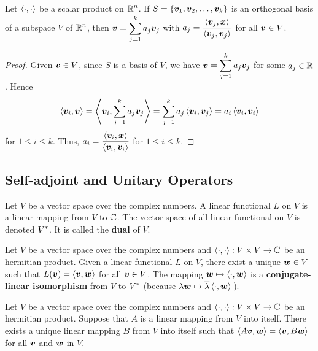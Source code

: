 \begin{prop}
Let $\left\langle{\cdot} , {\cdot}\right\rangle$ be a scalar product on $\displaystyle \mathbb{R}^n$.  If
$S = \{\bm{v}_1, \bm{v}_2, \ldots , \bm{v}_k\}$ is an orthogonal
basis of a subspace $V$ of $\displaystyle \mathbb{R}^n$, then
$\displaystyle \bm{v} = \sum_{j=1}^k a_j \bm{v}_j$ with
$\displaystyle a_j = \frac{\left\langle{\bm{v}_j} , {\bm{x}}\right\rangle}
{\left\langle{\bm{v}_j} , {\bm{v}_j}\right\rangle}$ for all $\bm{v} \in V$.
\label{C14L2}
\end{prop}

\begin{proof}
Given $\bm{v} \in V$, since $S$ is a basis of $V$, we have
$\displaystyle \bm{v} = \sum_{j=1}^k a_j \bm{v}_j$ for some
$a_j \in \mathbb{R}$.  Hence
\[
\left\langle{\bm{v}_i} , {\bm{v}}\right\rangle =
\left\langle{\bm{v}_i} , {\sum_{j=1}^k a_j \bm{v}_j}\right\rangle
= \sum_{j=1}^k a_j \left\langle{\bm{v}_i} , {\bm{v}_j}\right\rangle
= a_i \left\langle{\bm{v}_i} , {\bm{v}_i}\right\rangle
\]
for $1 \leq i \leq k$.  Thus,
$\displaystyle a_i = \frac{\left\langle{\bm{v}_i} , {\bm{x}}\right\rangle}
{\left\langle{\bm{v}_i} , {\bm{v}_i}\right\rangle}$ for $1 \leq i \leq k$.
\end{proof}

\subsection{Self-adjoint and Unitary Operators}

Let $V$ be a vector space over the complex numbers.  A linear
functional $L$ on $V$ is a linear mapping
from $V$ to $\mathbb{C}$.  The vector space of all linear functional on $V$
is denoted $\displaystyle V^\ast$. It is called the
{\bfseries dual} of $V$.

\begin{theorem}[Reisz]
Let $V$ be a vector space over the complex numbers and
$\left\langle{\cdot} , {\cdot}\right\rangle:V \times V \rightarrow \mathbb{C}$ be an hermitian product.
Given a linear functional $L$ on $V$, there exist a unique $\bm{w}\in V$
such that $L(\bm{v}) = \left\langle{\bm{v}} , {\bm{w}}\right\rangle$ for all $\bm{v} \in V$.  The
mapping $\bm{w} \mapsto \left\langle{\cdot} , {\bm{w}}\right\rangle$ is a
{\bfseries conjugate-linear isomorphism}
from $V$ to $\displaystyle V^\ast$ (because
$\lambda \bm{w} \mapsto \overline{\lambda} \left\langle{\cdot} , {\bm{w}}\right\rangle$\,).
\end{theorem}

\begin{cor}
Let $V$ be a vector space over the complex numbers and
$\left\langle{\cdot} , {\cdot}\right\rangle:V \times V \rightarrow \mathbb{C}$ be an hermitian product.
Suppose that $A$ is a linear mapping from $V$ into itself.  There exists a
unique linear mapping $B$ from $V$ into itself such that
$\left\langle{A\bm{v}} , {\bm{w}}\right\rangle = \left\langle{\bm{v}} , {B\bm{w}}\right\rangle$ for all $\bm{v}$ and
$\bm{w}$ in $V$.
\label{C14L3}
\end{cor}

